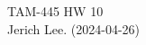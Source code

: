 \documentclass[12pt]{article}
\begin{document}
\noindent TAM-445 \hfill HW 10\\
Jerich Lee. (2024-04-26)

\hrulefill



\end{document}
